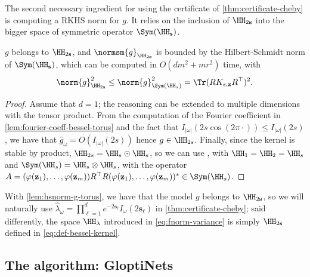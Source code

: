\documentclass{article}
\begin{document}
The second necessary ingredient for using the certificate of \cref{thm:certificate-cheby} is computing a RKHS norm for $g$. It relies on the inclusion of $\HH_{2\mathbf{s}}$ into the bigger space of symmetric operator $\Sym(\HH_\mathbf{s})$.

\begin{lemma}\label{lem:hsnorm-g-torus}
  $g$ belongs to $\HH_{2\mathbf{s}}$, and $\normsm{g}_{\HH_{2\mathbf{s}}}$ is bounded by the Hilbert-Schmidt norm of $\Sym(\HH_\mathbf{s})$, which can be computed in $O(d m^2 + m r^2)$ time, with
  \begin{equation}
    \norm{g}_{\HH_{2\mathbf{s}}}^2 \leq \norm{g}_{\Sym(\HH_s)}^2 = \Tr (R K_{s, \mathbf{z}} R^\top)^2.
  \end{equation}
\end{lemma}

\begin{proof}
  Assume that $d=1$; the reasoning can be extended to multiple dimensions with the tensor product. From the computation of the Fourier coefficient in \cref{lem:fourier-coeff-bessel-torus} and the fact that $I_{|\omega|}(2s \cos(2\pi \cdot)) \leq I_{|\omega|}(2s)$, we have that $\hat{g}_\omega = O(I_{|\omega|}(2s))$ hence $g \in \HH_{2s}$. Finally, since the kernel is stable by product, $\HH_{2s} = \HH_s \odot \HH_s$, so we can use \eg \cite[Thm. 5.16]{paulsenIntroductionTheoryReproducing2016}, with $\HH_1 = \HH_2 = \HH_s$ and $\Sym(\HH_s) = \HH_s \otimes \HH_s$, with the operator $A = (\varphi(\mathbf{z}_1), \dots, \varphi(\mathbf{z}_m)) R^\top R (\varphi(\mathbf{z}_1), \dots, \varphi(\mathbf{z}_m))^* \in \Sym(\HH_s)$.
\end{proof}

With \cref{lem:hsnorm-g-torus}, we have that the model $g$ belongs to $\HH_{2 \mathbf{s}}$, so we will naturally use $\hat{\lambda}_\omega = \prod_{\ell = 1}^d e^{-2\mathbf{s}_\ell} I_{\omega}(2\mathbf{s}_\ell)$ in \cref{thm:certificate-cheby}; said differently, the space $\HH_\lambda$ introduced in \cref{eq:fnorm-variance} is simply $\HH_{2 \mathbf{s}}$ defined in \cref{eq:def-bessel-kernel}.

\subsection{The algorithm: GloptiNets}
\label{sec:algorithm}
\end{document}
